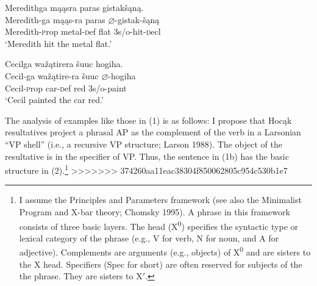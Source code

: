 \documentclass[output=paper]{LSP/langsci}
\begin{document}
\begin{exe}
\ex
\begin{xlist}

\ex \glll Meredithga m\k{a}\k{a}sra paras gistak\v{s}\k{a}n\k{a}. \\
 Meredith-ga m\k{a}\k{a}s-ra paras $\varnothing$-gistak-\v{s}\k{a}n\k{a}\\
Meredith-{\textsc prop} metal-{\textsc def} flat {\textsc 3s/o}-hit-{\textsc decl}\\
\glt `Meredith hit the metal flat.'

\ex \glll Cecilga wa\v{z}\k{a}tirera \v{s}uuc hogiha. \\
Cecil-ga  wa\v{z}\k{a}tire-ra \v{s}uuc $\varnothing$-hogiha \\
Cecil-{\textsc prop} car-{\textsc def} red {\textsc 3s/o}-paint\\
\glt `Cecil painted the car red.'

\end{xlist}
\end{exe}

The analysis of examples like those in (1) is as follows: I propose that Hoc\k{a}k resultatives project a phrasal AP as the complement of the verb in a Larsonian ``VP shell'' (i.e., a recursive VP structure; Larson 1988). The object of the resultative is in the specifier of VP. Thus, the sentence in (1b) has the basic structure in (2).\footnote{I assume the Principles and Parameters framework (see also the Minimalist Program and X-bar theory; Chomsky 1995). A phrase in this framework consists of three basic layers. The head (X\textsuperscript{0}) specifies the syntactic type or lexical category of the phrase (e.g., V for verb, N for noun, and A for adjective). Complements are arguments (e.g., objects) of X\textsuperscript{0} and are sisters to the X head. Specifiers (Spec for short) are often reserved for subjects of the the phrase. They are sisters to X$'$.}
>>>>>>> 374260aa11eac38304f850062805c954c530b1e7
\begin{exe}
\ex

{\hspace{1em}}\newline
{}
\end{exe}
\end{document}
